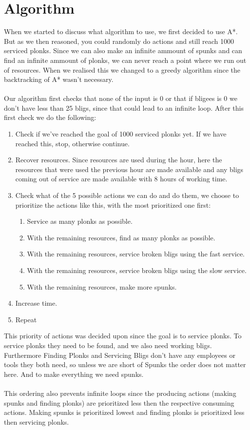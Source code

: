 \documentclass{article}
\begin{document}
\section*{Algorithm}
When we started to discuss what algorithm to use, we first decided to use A*. But as we then reasoned, you could randomly do actions and still reach 1000 serviced plonks. Since we can also make an infinite ammount of spunks and can find an infinite ammount of plonks, we can never reach a point where we run out of resources. When we realised this we changed to a greedy algorithm since the backtracking of A* wasn't necessary.
\\ \\
Our algorithm first checks that none of the input is 0 or that if bligees is 0 we don't have less than 25 bligs, since that could lead to an infinite loop. After this first check we do the following:
\begin{enumerate}
	\item Check if we've reached the goal of 1000 serviced plonks yet. If we have reached this, stop, otherwise continue.
	\item Recover resources. Since resources are used during the hour, here the resources that were used the previous hour are made available and any bligs coming out of service are made available with 8 hours of working time.
	\item Check what of the 5 possible actions we can do and do them, we choose to prioritize the actions like this, with the most prioritized one first:
	\begin{enumerate}
		\item Service as many plonks as possible.
		\item With the remaining resources, find as many plonks as possible.
		\item With the remaining resources, service broken bligs using the fast service.
		\item With the remaining resources, service broken bligs using the slow service.
		\item With the remaining resources, make more spunks.
	\end{enumerate}
	\item Increase time.
	\item Repeat
\end{enumerate}

This priority of actions was decided upon since the goal is to service plonks. To service plonks they need to be found, and we also need working bligs. Furthermore Finding Plonks and Servicing Bligs don't have any employees or tools they both need, so unless we are short of Spunks the order does not matter here. And to make everything we need spunks. 
\\ \\
This ordering also prevents infinite loops since the producing actions (making spunks and finding plonks) are prioritized less then the respective consuming actions. Making spunks is prioritized lowest and finding plonks is prioritized less then servicing plonks.
\end{document}
